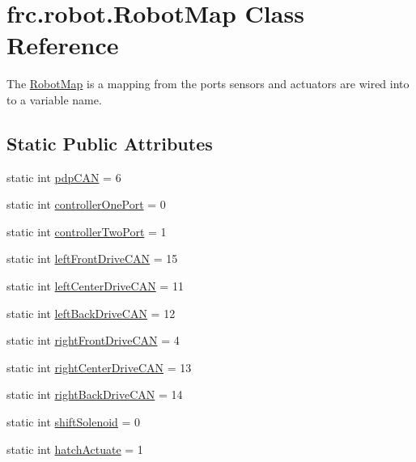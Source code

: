 \hypertarget{classfrc_1_1robot_1_1RobotMap}{}\section{frc.\+robot.\+Robot\+Map Class Reference}
\label{classfrc_1_1robot_1_1RobotMap}


The \hyperlink{classfrc_1_1robot_1_1RobotMap}{Robot\+Map} is a mapping from the ports sensors and actuators are wired into to a variable name.  


\subsection*{Static Public Attributes}
\begin{DoxyCompactItemize}
\item 
static int \hyperlink{classfrc_1_1robot_1_1RobotMap_af7db1426412719318df15f9838b70198}{pdp\+C\+AN} = 6
\item 
static int \hyperlink{classfrc_1_1robot_1_1RobotMap_adf0118e5a9de03d6f71ea1e5a6a81cc9}{controller\+One\+Port} = 0
\item 
static int \hyperlink{classfrc_1_1robot_1_1RobotMap_a762ebcaa07378c37d88654506850e07f}{controller\+Two\+Port} = 1
\item 
static int \hyperlink{classfrc_1_1robot_1_1RobotMap_a2e3dbfb148d6fa2b7f430614887217f0}{left\+Front\+Drive\+C\+AN} = 15
\item 
static int \hyperlink{classfrc_1_1robot_1_1RobotMap_a9d04abf669a5ad42cb023e3ff3b56bcd}{left\+Center\+Drive\+C\+AN} = 11
\item 
static int \hyperlink{classfrc_1_1robot_1_1RobotMap_a0f78f6850b0e060cc6acd88cc80ffa04}{left\+Back\+Drive\+C\+AN} = 12
\item 
static int \hyperlink{classfrc_1_1robot_1_1RobotMap_a4ca461a7ad91df180971974fd6abc236}{right\+Front\+Drive\+C\+AN} = 4
\item 
static int \hyperlink{classfrc_1_1robot_1_1RobotMap_a3ca36356410531e52126d2979ee17f13}{right\+Center\+Drive\+C\+AN} = 13
\item 
static int \hyperlink{classfrc_1_1robot_1_1RobotMap_a0fb2fff6bf26e3f196d1cb02a89072c3}{right\+Back\+Drive\+C\+AN} = 14
\item 
static int \hyperlink{classfrc_1_1robot_1_1RobotMap_aeb2d5ba2420aa4acb2c40f409580df82}{shift\+Solenoid} = 0
\item 
static int \hyperlink{classfrc_1_1robot_1_1RobotMap_a7bec1963c7590911eb30697b0707d9b4}{hatch\+Actuate} = 1

\end{DoxyCompactItemize}
